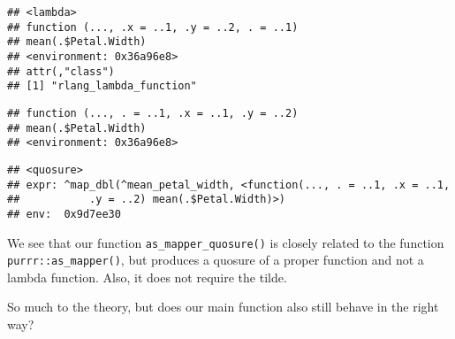\documentclass[]{book}
\newenvironment{Shaded}{\begin{snugshade}}{\end{snugshade}}
\newcommand{\DataTypeTok}[1]{\textcolor[rgb]{0.13,0.29,0.53}{#1}}
\newcommand{\KeywordTok}[1]{\textcolor[rgb]{0.13,0.29,0.53}{\textbf{#1}}}
\newcommand{\NormalTok}[1]{#1}
\newcommand{\OperatorTok}[1]{\textcolor[rgb]{0.81,0.36,0.00}{\textbf{#1}}}
\newcommand{\StringTok}[1]{\textcolor[rgb]{0.31,0.60,0.02}{#1}}
\begin{document}
\begin{verbatim}
## <lambda>
## function (..., .x = ..1, .y = ..2, . = ..1) 
## mean(.$Petal.Width)
## <environment: 0x36a96e8>
## attr(,"class")
## [1] "rlang_lambda_function"
\end{verbatim}

\begin{Shaded}
\end{Shaded}

\begin{verbatim}
## function (..., . = ..1, .x = ..1, .y = ..2) 
## mean(.$Petal.Width)
## <environment: 0x36a96e8>
\end{verbatim}

\begin{Shaded}
\end{Shaded}

\begin{verbatim}
## <quosure>
## expr: ^map_dbl(^mean_petal_width, <function(..., . = ..1, .x = ..1,
##           .y = ..2) mean(.$Petal.Width)>)
## env:  0x9d7ee30
\end{verbatim}

We see that our function \texttt{as\_mapper\_quosure()} is closely related to the function \texttt{purrr::as\_mapper()}, but produces a quosure of a proper function and not a lambda function.
Also, it does not require the tilde.

So much to the theory, but does our main function also still behave in the right way?

\begin{Shaded}
\end{Shaded}
\end{document}
